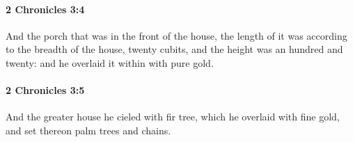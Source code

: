 		\paragraph{2 Chronicles 3:4} %
			\label{2CHRONICLES-3-4}

			And the porch that was in the front of the house, the length of it was according to the breadth of the house, twenty cubits, and the height was an hundred and twenty: and he overlaid it within with pure gold.


		\paragraph{2 Chronicles 3:5} %
			\label{2CHRONICLES-3-5}

			And the greater house he cieled with fir tree, which he overlaid with fine gold, and set thereon palm trees and chains.


